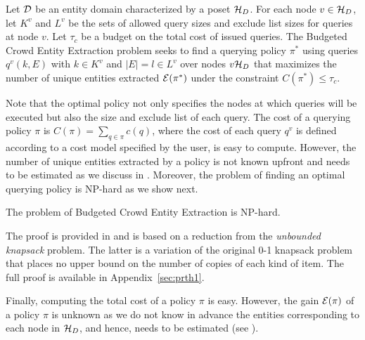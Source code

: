 \begin{problem}
Let $\mathcal{D}$ be an entity domain characterized by a poset $\mathcal{H}_D$. For each node $v \in \mathcal{H}_D$, let $K^v$ and $L^v$ be the sets of allowed query sizes and exclude list sizes for queries at node $v$. Let $\tau_c$ be a budget on the total cost of issued queries. The Budgeted Crowd Entity Extraction problem seeks to find a querying policy $\pi^*$ using queries $q^v(k,E)$ with $k \in K^v$ and $|E| = l \in L^v$ over nodes $v \mathcal{H}_D$ that maximizes the number of unique entities extracted $\mathcal{E}(\pi^*)$ under the constraint $C(\pi^*) \leq \tau_c$.
\end{problem}
Note that the optimal policy not only specifies the nodes at which queries will be executed but also the size and exclude list of each query. The cost of a querying policy $\pi$ is $C(\pi) = \sum_{q \in \pi} c(q)$, where the cost of each query $q^v$ is defined according to a cost model specified by the user, is easy to compute. However, the number of unique entities extracted by a policy is not known upfront and needs to be estimated as we discuss in . Moreover, the problem of finding an optimal querying policy is NP-hard as we show next. 

\begin{theorem}[{\bf NP-Hardness}]
The problem of Budgeted Crowd Entity Extraction is NP-hard.
\end{theorem}
The proof is provided in  and is based on a reduction from the {\em unbounded knapsack} problem. The latter is a variation of the original 0-1 knapsack problem that places no upper bound on the number of copies of each kind of item. The full proof is available in Appendix~\ref{sec:prth1}.

Finally, computing the total cost of a policy $\pi$ is easy. However, the gain $\mathcal{E}(\pi)$ of a policy $\pi$ is unknown as we do not know in advance the entities corresponding to each node in $\mathcal{H}_D$, and hence, needs to be estimated (see ). 

